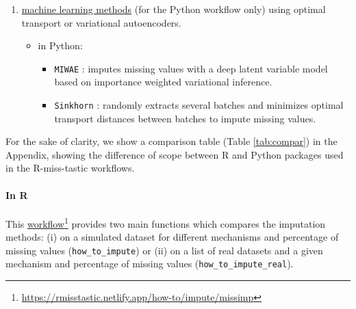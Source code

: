 \begin{enumerate}
\begin{itemize}
\begin{itemize}
        \end{itemize}
        \item in {Python}:  (coded for the purpose of this notebook and available  \href{https://github.com/R-miss-tastic/website/blob/master/static/how-to/python/softimpute.py}{here}\footnote{\url{https://github.com/R-miss-tastic/website/blob/master/static/how-to/python/softimpute.py}}), which minimizes the re-weighted least squares error penalized by the nuclear norm and with an internal cross-validation step to choose the regularization parameter. 
    \end{itemize}
    \item \underline{machine learning methods} (for the {Python} workflow only) using optimal transport or variational autoencoders.
    \begin{itemize}
        \item in {Python}:  
        \begin{itemize}
            \item \texttt{MIWAE} \citep{mattei2019miwae}: imputes missing values with a deep latent variable model based on importance weighted variational inference.
            \item \texttt{Sinkhorn} \citep{muzellec2020missing}: randomly extracts several batches and minimizes optimal transport distances between batches to impute missing values. 
        \end{itemize}
    \end{itemize}
\end{enumerate}
For the sake of clarity, we show a comparison table (Table \ref{tab:compar}) in the Appendix, showing the difference of scope between R and Python packages used in the R-miss-tastic workflows.


\paragraph*{In {R}} This \href{https://rmisstastic.netlify.app/how-to/impute/missimp}{workflow}\footnote{\url{https://rmisstastic.netlify.app/how-to/impute/missimp}} provides two main functions which compares the imputation methods: (i) on a simulated dataset for different mechanisms and percentage of missing values (\texttt{how\_to\_impute}) or (ii) on a list of real datasets and a given mechanism and percentage of missing values (\texttt{how\_to\_impute\_real}). 

